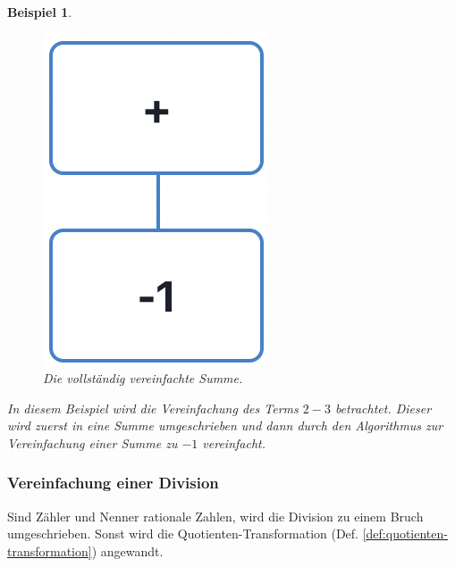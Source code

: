\documentclass[11pt]{article}
\newcommand{\lab}[1]{(Def. \ref{#1})}
\newtheorem{example}{Beispiel}
\begin{document}
\begin{example}
\begin{figure}[h]
    \includegraphics[scale=0.4]{trees/difference/beispiel_1_3.png}
    \caption{Die vollständig vereinfachte Summe.}
  \end{figure}
  In diesem Beispiel wird die Vereinfachung des Terms $2-3$ betrachtet. Dieser wird zuerst in eine Summe
  umgeschrieben und dann durch den Algorithmus zur Vereinfachung einer Summe zu $-1$ vereinfacht.
\end{example}

\subsubsection{Vereinfachung einer Division}
Sind Zähler und Nenner rationale Zahlen, wird die Division zu einem Bruch umgeschrieben.
Sonst wird die Quotienten-Transformation \lab{def:quotienten-transformation} angewandt.
\end{document}
